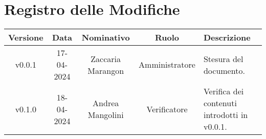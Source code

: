 \section*{\Large Registro delle Modifiche}
    \begin{table}[h]
        \centering
        \renewcommand\tabularxcolumn[1]{m{#1}} %
        \renewcommand{\arraystretch}{1.5}
        \begin{tabularx}{0.98\textwidth}
            {c|c|c|c|>{\centering\arraybackslash}X}
            \rowcolor{black}
            \textbf{\color{white} Versione} & \textbf{\color{white} Data} & \textbf{\color{white} Nominativo} & \textbf{\color{white} Ruolo} & \textbf{\color{white} Descrizione} \\ 
            \hline

            v0.0.1 & 17-04-2024 & Zaccaria Marangon & Amministratore & Stesura del documento.\\
            v0.1.0 & 18-04-2024 & Andrea Mangolini & Verificatore & Verifica dei contenuti introdotti in v0.0.1.\\
           
            \hline
        \end{tabularx}
    \end{table}